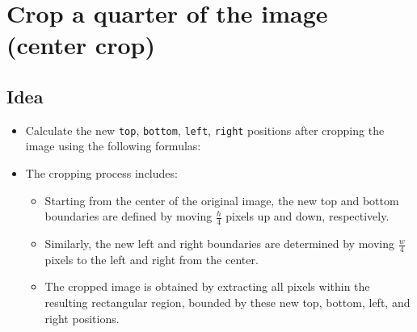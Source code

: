 \chapter{Crop a quarter of the image (center crop)}

\section{Idea}
\noindent
\begin{itemize}
    \item Calculate the new \texttt{top}, \texttt{bottom}, \texttt{left}, \texttt{right} positions after cropping the image using the following formulas:
\end{itemize}

\begin{center}
\end{center}

\begin{itemize}
    \item The cropping process includes:
    \begin{itemize}[label=$\circ$]
        \item Starting from the center of the original image, the new top and bottom boundaries are defined by moving $\frac{h}{4}$ pixels up and down, respectively.
        \item Similarly, the new left and right boundaries are determined by moving $\frac{w}{4}$ pixels to the left and right from the center.
        \item The cropped image is obtained by extracting all pixels within the resulting rectangular region, bounded by these new top, bottom, left, and right positions.
    \end{itemize}
\end{itemize}

